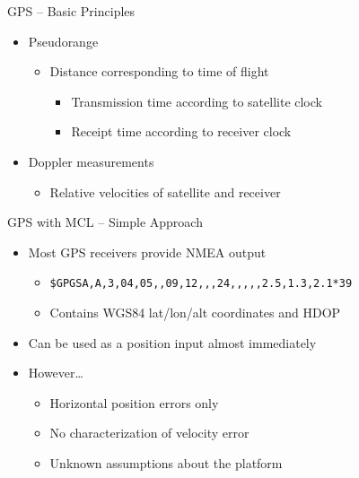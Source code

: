 \documentclass[utf8,12pt]{beamer}
\begin{document}
{
\begin{frame}{GPS -- Basic Principles}
    \begin{itemize}
        \item Pseudorange
        \begin{itemize}
            \item Distance corresponding to time of flight
            \begin{itemize}
                \item Transmission time according to satellite clock
                \item Receipt time according to receiver clock
            \end{itemize}
        \end{itemize}
        \item Doppler measurements
        \begin{itemize}
            \item Relative velocities of satellite and receiver
        \end{itemize}
    \end{itemize}
\end{frame}
}

{
\begin{frame}[fragile]{GPS with MCL -- Simple Approach}
    \begin{itemize}
        \item Most GPS receivers provide NMEA output
        \begin{itemize}
            \item{\footnotesize\verb=$GPGSA,A,3,04,05,,09,12,,,24,,,,,2.5,1.3,2.1*39=}
            \item Contains WGS84 lat/lon/alt coordinates and HDOP
        \end{itemize}
        \item Can be used as a position input almost immediately
    \item However\ldots
        \begin{itemize}
            \item Horizontal position errors only
            \item No characterization of velocity error
            \item Unknown assumptions about the platform
        \end{itemize}
    \end{itemize}
\end{frame}
}
\end{document}
